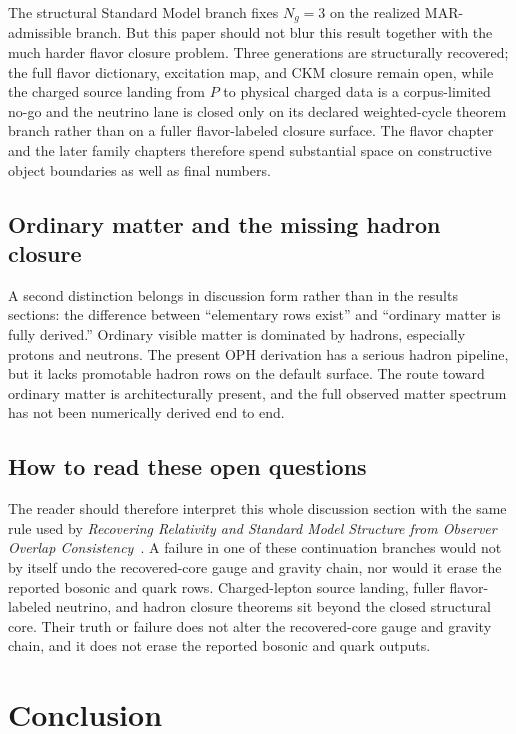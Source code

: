 \documentclass[11pt]{article}
\begin{document}
The structural Standard Model branch fixes \(N_g=3\) on the realized MAR-admissible
branch. But this paper should not blur this result together with the much harder flavor
closure problem. Three generations are structurally recovered; the full flavor dictionary,
excitation map, and CKM closure remain open, while the charged source landing from \(P\) to physical charged data is a corpus-limited no-go and the neutrino
lane is closed only on its declared weighted-cycle theorem branch rather than on a fuller
flavor-labeled closure surface.
The flavor chapter and the later family chapters therefore spend substantial space on
constructive object boundaries as well as final numbers.

\subsection{Ordinary matter and the missing hadron closure}

A second distinction belongs in discussion form rather than in the results sections: the
difference between ``elementary rows exist'' and ``ordinary matter is fully derived.'' Ordinary
visible matter is dominated by hadrons, especially protons and neutrons. The present OPH
derivation has a serious hadron pipeline, but it lacks promotable hadron rows on the
default surface. The route toward ordinary matter is architecturally present, and the full
observed matter spectrum has not been numerically derived end to end.

\subsection{How to read these open questions}

The reader should therefore interpret this whole discussion section with the same rule used by
\emph{Recovering Relativity and Standard Model Structure from Observer Overlap Consistency}~\cite{ophcompact}. A failure in one of these continuation branches would not by itself undo the
recovered-core gauge and gravity chain, nor would it erase the reported bosonic and quark
rows. Charged-lepton source landing, fuller flavor-labeled neutrino, and hadron closure theorems sit beyond the
closed structural core. Their truth or failure does not alter the recovered-core gauge and
gravity chain, and it does not erase the reported bosonic and quark outputs.

\section{Conclusion}
\end{document}
